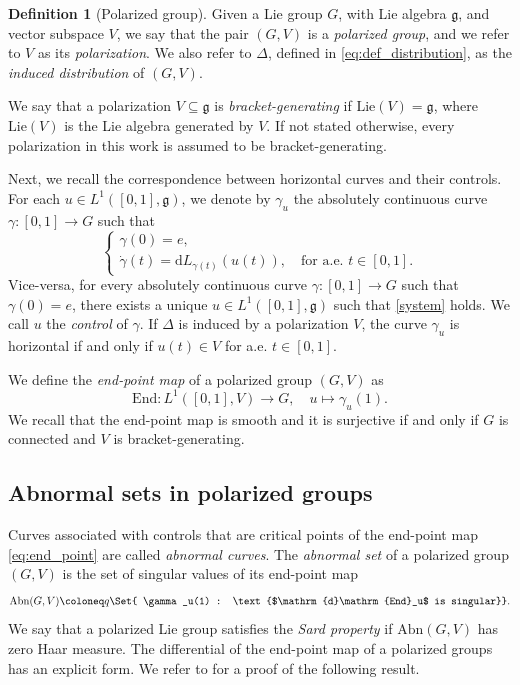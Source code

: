 \documentclass[a4paper,11pt,reqno]{amsart}
\theoremstyle{plain}
\theoremstyle{definition}
\newtheorem{definition}[theorem]{Definition}
\newcommand{\g}{\mathfrak{g}}
\newcommand{\id}{e}
\newcommand{\de}{\mathrm{d}}
\newcommand{\End}{\mathrm{End}}
\newcommand{\abn}{\mathrm{Abn}}
\newcommand{\Lie}{\mathrm{Lie}}
\begin{document}
\begin{definition}[Polarized group] Given a Lie group $G$, with Lie algebra $\g$, and vector subspace $V$, we say that the pair $(G,V)$ is a \emph{polarized group}, and we refer to $V$ as its \emph{polarization}. We also refer to $\Delta$, defined in \eqref{eq:def_distribution}, as the \emph{induced distribution} of $(G,V)$.
\end{definition}

We say that a polarization $V \subseteq \g$ is \emph{bracket-generating} if $\Lie(V)=\g$, where $\Lie(V)$ is the Lie algebra generated by $V$. If not stated otherwise, every polarization in this work is assumed to be bracket-generating. 

Next, we recall the correspondence between horizontal curves and their controls.
For each $u \in L^1([0,1],\g)$, we denote by $\gamma_u$ the absolutely continuous curve $\gamma \colon [0,1] \to G$ such that 
\begin{equation} \label{system}
 \begin{cases} 
 \gamma(0)=\id, \\ \dot{\gamma}(t)= \de L_{\gamma(t)}(u(t)), \quad \text{for a.e. $t \in [0,1]$.}
 \end{cases}
\end{equation}
Vice-versa, for every absolutely continuous curve $\gamma \colon [0,1] \to G$ such that $\gamma(0)=\id$, there exists a unique $u \in L^1([0,1],\g)$ such that \eqref{system} holds. We call $u$ the {\em control} of $\gamma$. If $\Delta$ is induced by a polarization $V$, the curve $\gamma_u$ is horizontal if and only if $u(t) \in V$ for a.e. $t \in [0,1]$.

We define the \emph{end-point map} of a polarized group $(G,V)$ as
\begin{equation} \label{eq:end_point}
    \End \colon L^1([0,1],V) \to G, \quad u \mapsto \gamma_u(1).
\end{equation}
We recall that the end-point map is smooth and it is surjective if and only if $G$ is connected and $V$ is bracket-generating.

\subsection{Abnormal sets in polarized groups}

Curves associated with controls that are  critical points of the end-point map \eqref{eq:end_point} are called \emph{abnormal curves}. The \emph{abnormal set} of a polarized group $(G,V)$ is the set of singular values of its end-point map
\begin{equation} \label{eq:abnormal_set}
    \abn(G,V) \coloneq q \Set{ \gamma_u(1) : \text{$\de \End_u$ is singular}}.
\end{equation}
We say that a polarized Lie group satisfies the \emph{Sard property} if $\abn(G,V)$ has zero Haar measure. The differential of the end-point map of a polarized groups has an explicit form. We refer to \cite[Proposition~7.2.1]{donne2024metricliegroupscarnotcaratheodory} for a proof of the following result.
\end{document}
